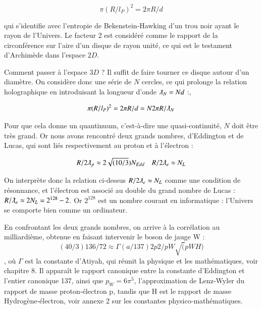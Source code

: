 \documentclass[a4paper,12pt]{article}
\begin{document}
\begin{equation}
\pi(R/l_P)^2 = 2 \pi R/d 
\end{equation}


qui s'identifie avec l'entropie de Bekenstein-Hawking d'un trou noir ayant le rayon de l'Univers. Le facteur 2 est considéré comme le rapport de la circonférence sur l'aire d'un disque de rayon unité, ce qui est le testament d'Archimède dans l'espace $2D$.


      Comment passer à l'espace $3D$ ? Il suffit de faire tourner ce disque autour d'un diamètre. On considère donc une série de $N$ cercles, ce qui prolonge la relation holographique en introduisant la longueur d'onde $\lambdabar_N = N d$  :,


\begin{equation}
\pi (R/l_P)^2 = 2 \pi R/d  = N 2\pi R/\lambdabar_N 
\end{equation}


Pour que cela donne un quantinuum, c'est-à-dire une quasi-continuité, $ N$ doit être très grand. Or nous avons rencontré deux grands nombres, d'Eddington et de Lucas, qui sont liés respectivement au proton et à l'électron :


\begin{equation}
R/2\lambdabar_p \approx 2\sqrt{(10/3})N_{Edd}     ~~~~   R/2\lambdabar_e \approx N_L 
\end{equation}



On interprète donc la relation ci-dessus $R/2\lambdabar_e \approx N_L$ comme une condition de résonnance, et l'électron est associé au double du grand nombre de Lucas : $R/\lambdabar_e \approx 2 N_L = 2^{128}-2$. Or $2^{128}$ est un nombre courant en informatique : l'Univers se comporte bien comme un ordinateur.

En confrontant les deux grands nombres, on arrive à la corrélation au milliardième, obtenue en faisant intervenir le boson de jauge W : 
\begin{equation}
(40/3)136/72 \approx \Gamma(a/137)2 p2/pW\sqrt(pW H)
\end{equation}, où $\Gamma$ est  la constante d'Atiyah, qui réunit la physique et les mathématiques, voir chapitre 8. Il apparaît le rapport canonique entre la constante d'Eddington et l'entier canonique 137, ainsi que $p_W = 6\pi^5$, l'approximation de Lenz-Wyler du rapport de masse proton-électron p, tandis que H est le rapport de masse Hydrogène-électron, voir annexe 2 sur les constantes physico-mathématiques. 
\end{document}
